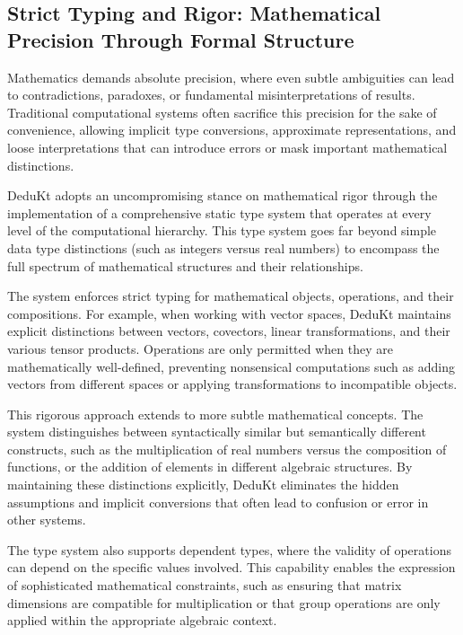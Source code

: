 \subsection{Strict Typing and Rigor: Mathematical Precision Through Formal Structure}\label{subsec:strict-typing-and-rigor:-mathematical-precision-through-formal-structure}

Mathematics demands absolute precision, where even subtle ambiguities can lead to contradictions, paradoxes, or fundamental misinterpretations of results.
Traditional computational systems often sacrifice this precision for the sake of convenience, allowing implicit type conversions, approximate representations, and loose interpretations that can introduce errors or mask important mathematical distinctions.

DeduKt adopts an uncompromising stance on mathematical rigor through the implementation of a comprehensive static type system that operates at every level of the computational hierarchy.
This type system goes far beyond simple data type distinctions (such as integers versus real numbers) to encompass the full spectrum of mathematical structures and their relationships.

The system enforces strict typing for mathematical objects, operations, and their compositions.
For example, when working with vector spaces, DeduKt maintains explicit distinctions between vectors, covectors, linear transformations, and their various tensor products.
Operations are only permitted when they are mathematically well-defined, preventing nonsensical computations such as adding vectors from different spaces or applying transformations to incompatible objects.

This rigorous approach extends to more subtle mathematical concepts.
The system distinguishes between syntactically similar but semantically different constructs, such as the multiplication of real numbers versus the composition of functions, or the addition of elements in different algebraic structures.
By maintaining these distinctions explicitly, DeduKt eliminates the hidden assumptions and implicit conversions that often lead to confusion or error in other systems.

The type system also supports dependent types, where the validity of operations can depend on the specific values involved.
This capability enables the expression of sophisticated mathematical constraints, such as ensuring that matrix dimensions are compatible for multiplication or that group operations are only applied within the appropriate algebraic context.

